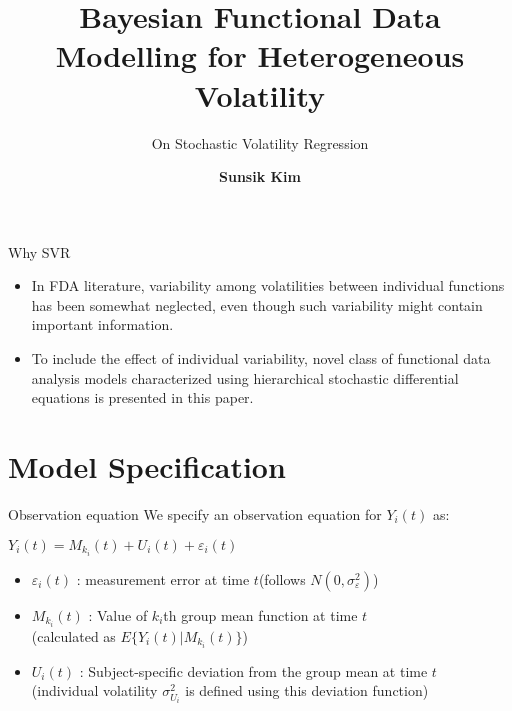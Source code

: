\documentclass[10pt]{beamer}
\title{Bayesian Functional Data Modelling for Heterogeneous Volatility}
\subtitle{On Stochastic Volatility Regression}
\author{\large{\textbf{Sunsik Kim}}}
\date{}
\def\mean{M_{k_i}(t)}
\def\dev{U_i(t)}
\def\vol{\sigma_{U_i}^2}
\begin{document}
\maketitle


\begin{frame}[t]{Why SVR}
\vspace{4pt}
\begin{itemize}
\item In FDA literature, variability among volatilities between individual functions has been somewhat neglected, even though such variability might contain important information.
\item To include the effect of individual variability, novel class of functional data analysis models characterized using hierarchical stochastic differential equations is presented in this paper.
\end{itemize}
\end{frame}


\section{Model Specification}
\begin{frame}[t]{Observation equation}
\vspace{4pt}
We specify an observation equation for $Y_i(t)$ as:
\begin{center}
$Y_i(t)=\mean+\dev+\varepsilon_i(t)$
\end{center}
\begin{itemize}
\item $\varepsilon_i(t)$ : measurement error at time $t$(follows $N(0,\sigma^{2}_{\varepsilon})$)
\item $\mean$ : Value of $k_i$th group mean function at time $t$\\
(calculated as $E\{Y_i(t)|M_{k_i}(t)\}$)
\item $\dev$ : Subject-specific deviation from the group mean at time $t$\\
(individual volatility $\vol$ is defined using this deviation function)
\end{itemize}
\end{frame}
\end{document}
